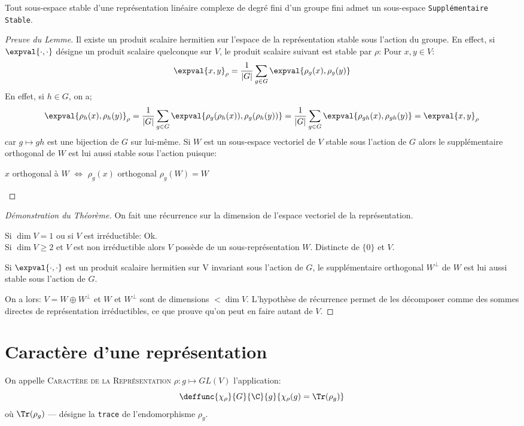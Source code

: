 \begin{lemme}
	Tout sous-espace stable d'une représentation linéaire complexe de degré fini d'un groupe fini admet un sous-espace \texttt{Supplémentaire Stable}.
\end{lemme}
\begin{proof}[Preuve du Lemme]
	Il existe un produit scalaire hermitien sur l'espace de la représentation stable sous l'action du groupe. En effect, si $\expval{\cdot,\cdot}$ désigne un produit scalaire quelconque sur $V$, le produit scalaire suivant est stable par $\rho$:
	Pour $x,y\in V$:
	$$\expval{x,y}_\rho=\frac 1{|G|}\sum_{g\in G}\expval{\rho_g(x),\rho_g(y)}$$
	En effet, si $h\in G$, on a;
	$$\expval{\rho_h(x),\rho_h(y)}_\rho=\frac 1{|G|}\sum_{g\in G}\expval{\rho_g(\rho_h(x)),\rho_g(\rho_h(y))}=\frac 1{|G|}\sum_{g\in G}\expval{\rho_{gh}(x),\rho_{gh}(y)} = \expval{x,y}_\rho$$ car $g\mapsto gh$ est une bijection de $G$ sur lui-même.
	Si $W$ est un sous-espace vectoriel de $V$ stable sous l'action de $G$  alors le supplémentaire orthogonal de $W$ est lui aussi stable sous l'action puisque:
	\begin{flushright}

	$x$ orthogonal à $W$ $\Longleftrightarrow$ $\rho_g(x)$ orthogonal $\rho_g(W)=W$
	\end{flushright}
\end{proof}
\begin{proof}[Démonstration du Théorème]
	On fait une récurrence sur la dimension de l'espace vectoriel de la représentation.

	Si $\dim V=1$ ou si $V$ est irréductible: Ok.\\
	Si $\dim V \geq 2$ et $V$ est non irréductible alors $V$ possède de un sous-représentation $W$. Distincte de $\{0\}$ et $V$.

	Si $\expval{\cdot, \cdot}$ est un produit scalaire hermitien sur V invariant sous l'action de $G$, le supplémentaire orthogonal $W^\perp$ de $W$ est lui aussi stable sous l'action de $G$.
	
	On a lors: $V=W\oplus W^\perp$ et $W$ et $W^\perp$ sont de dimensions $< \dim V$.
	L'hypothèse de récurrence permet de les décomposer comme des sommes directes de représentation irréductibles, ce que prouve qu'on peut en faire autant de $V$.
\end{proof}

\section{Caractère d'une représentation}
\begin{definition}
	On appelle \textsc{Caractère de la Représentation} $\rho:g\mapsto GL(V)$ l'application: 
	$$\deffunc{\chi_\rho}{G}{\C}{g}{\chi_\rho(g)=\Tr(\rho_g)}$$ 
	où $\Tr(\rho_g)$ --- désigne la \texttt{trace} de l'endomorphisme $\rho_g$.
\end{definition}

